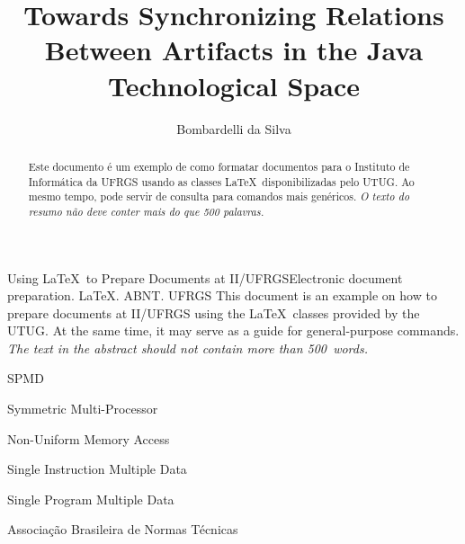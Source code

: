\documentclass[tuberlin,cic,tc,openright,english,noabntcite]{iiufrgs}
\title{Towards Synchronizing Relations Between Artifacts in the Java Technological Space}
\author{Bombardelli da Silva}{William}
\begin{document}
\maketitle





\begin{abstract}
    Este documento é um exemplo de como formatar documentos para o
    Instituto de Informática da UFRGS usando as classes \LaTeX\
    disponibilizadas pelo UTUG\@. Ao mesmo tempo, pode servir de consulta
    para comandos mais genéricos. \emph{O texto do resumo não deve
      conter mais do que 500 palavras.}
\end{abstract}

\begin{englishabstract}{Using \LaTeX\ to Prepare Documents at II/UFRGS}{Electronic document preparation. \LaTeX. ABNT. UFRGS}
    This document is an example on how to prepare documents at II/UFRGS
    using the \LaTeX\ classes provided by the UTUG\@. At the same time, it
    may serve as a guide for general-purpose commands. \emph{The text in
      the abstract should not contain more than 500~words.}
\end{englishabstract}

\listoffigures

\listoftables

\begin{listofabbrv}{SPMD}
    \item[SMP] Symmetric Multi-Processor
    \item[NUMA] Non-Uniform Memory Access
    \item[SIMD] Single Instruction Multiple Data
    \item[SPMD] Single Program Multiple Data
    \item[ABNT] Associação Brasileira de Normas Técnicas
\end{listofabbrv}
\end{document}
